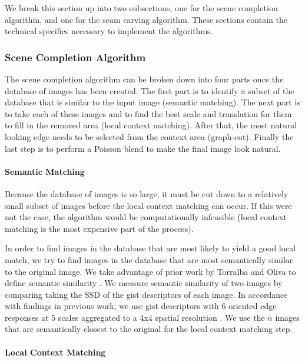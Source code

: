 \documentclass[11pt]{amsart}
\begin{document}
We break this section up into two subsections, one for the scene completion algorithm, and one
for the seam carving algorithm. These sections contain the technical specifics necessary to implement 
the algorithms.

\subsubsection{Scene Completion Algorithm}

The scene completion algorithm can be broken down into four parts once the database of images has been created. The first part is to identify a subset of the database that is similar to the input image (semantic matching). The next part is to take each of these images and to find the best scale and translation for them to fill in the removed area (local context matching). After that, the most natural looking edge needs to be selected from the context area (graph-cut). Finally the last step is to perform a Poisson blend to make the final image look natural.

\paragraph{\sc Semantic Matching} 

Because the database of images is so large, it must be cut down to a relatively small subset of images before the local context matching can occur. If this were not the case, the algorithm would be computationally infeasible (local context matching is the most expensive part of the process). 

In order to find images in the database that are most likely to yield a good local match, we try to find images in the database that are most semantically similar to the original image. We take advantage of prior work by Torralba and Oliva to define semantic similarity \cite{Torralba:2006}. We measure semantic similarity of two images by comparing taking the SSD of the gist descriptors of each image. In accordance with findings in previous work, we use gist descriptors with 6 oriented edge responses at 5 scales aggregated to a
4x4 spatial resolution \cite{Hays:2007}. We use the $n$ images that are semantically closest to the original
for the local context matching step. 

\paragraph{\sc Local Context Matching}
\end{document}
